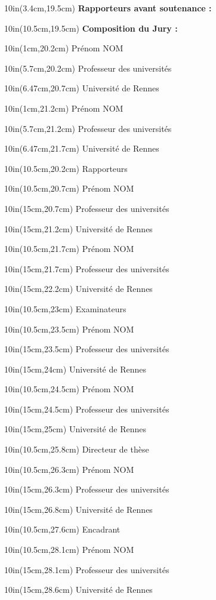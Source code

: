 \documentclass[a4paper]{report}
\newcommand\PlaceText[3]{%
\begin{textblock*}{10in}(#1,#2)  %
#3
\end{textblock*}
}%
\newcommand{\HRule}{\rule{\linewidth}{0.5mm}}
\begin{document}
\begin{titlepage}
{\PlaceText{3.4cm}{19.5cm}{\large \textbf{Rapporteurs avant soutenance :}}
\PlaceText{10.5cm}{19.5cm}{\large \textbf{Composition du Jury :}}

\PlaceText{1cm}{20.2cm}{\color{gray} Prénom NOM}
\PlaceText{5.7cm}{20.2cm}{\color{gray} Professeur des universités}
\PlaceText{6.47cm}{20.7cm}{\color{gray} Université de Rennes}

\PlaceText{1cm}{21.2cm}{\color{gray} Prénom NOM}
\PlaceText{5.7cm}{21.2cm}{\color{gray} Professeur des universités}
\PlaceText{6.47cm}{21.7cm}{\color{gray} Université de Rennes}

\PlaceText{10.5cm}{20.2cm}{\color{gray} Rapporteurs}
\PlaceText{10.5cm}{20.7cm}{\color{gray} Prénom NOM}
\PlaceText{15cm}{20.7cm}{\color{gray} Professeur des universités}
\PlaceText{15cm}{21.2cm}{\color{gray} Université de Rennes}

\PlaceText{10.5cm}{21.7cm}{\color{gray} Prénom NOM}
\PlaceText{15cm}{21.7cm}{\color{gray} Professeur des universités}
\PlaceText{15cm}{22.2cm}{\color{gray} Université de Rennes}

\PlaceText{10.5cm}{23cm}{\color{gray} Examinateurs}
\PlaceText{10.5cm}{23.5cm}{\color{gray} Prénom NOM}
\PlaceText{15cm}{23.5cm}{\color{gray} Professeur des universités}
\PlaceText{15cm}{24cm}{\color{gray} Université de Rennes}
\PlaceText{10.5cm}{24.5cm}{\color{gray} Prénom NOM}
\PlaceText{15cm}{24.5cm}{\color{gray} Professeur des universités}
\PlaceText{15cm}{25cm}{\color{gray} Université de Rennes}

\PlaceText{10.5cm}{25.8cm}{\color{gray} Directeur de thèse}
\PlaceText{10.5cm}{26.3cm}{\color{gray} Prénom NOM}
\PlaceText{15cm}{26.3cm}{\color{gray} Professeur des universités}
\PlaceText{15cm}{26.8cm}{\color{gray} Université de Rennes}

\PlaceText{10.5cm}{27.6cm}{\color{gray} Encadrant}
\PlaceText{10.5cm}{28.1cm}{\color{gray} Prénom NOM}
\PlaceText{15cm}{28.1cm}{\color{gray} Professeur des universités}
\PlaceText{15cm}{28.6cm}{\color{gray} Université de Rennes}
}

\end{titlepage}
\ClearShipoutPicture
\end{document}
